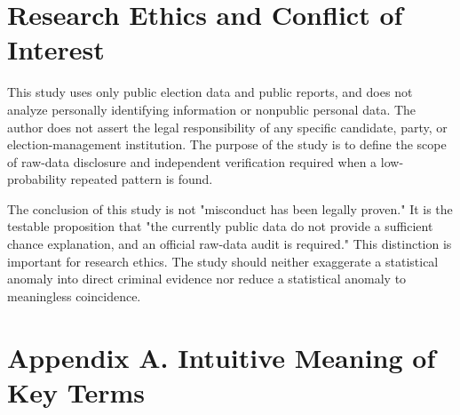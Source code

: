 \documentclass[preprint]{../ieie/IEIE}
\begin{document}
\section{Research Ethics and Conflict of Interest}

This study uses only public election data and public reports, and does not analyze personally identifying information or nonpublic personal data. The author does not assert the legal responsibility of any specific candidate, party, or election-management institution. The purpose of the study is to define the scope of raw-data disclosure and independent verification required when a low-probability repeated pattern is found.

The conclusion of this study is not "misconduct has been legally proven." It is the testable proposition that "the currently public data do not provide a sufficient chance explanation, and an official raw-data audit is required." This distinction is important for research ethics. The study should neither exaggerate a statistical anomaly into direct criminal evidence nor reduce a statistical anomaly to meaningless coincidence.

\clearpage
\onecolumn
\section*{Appendix A. Intuitive Meaning of Key Terms}
\end{document}
